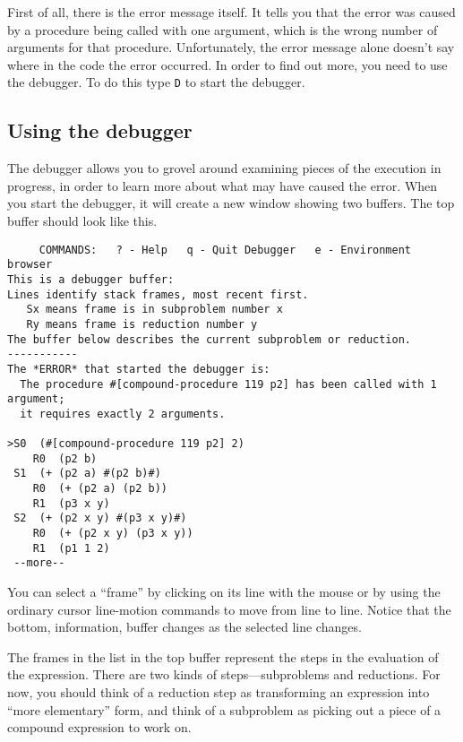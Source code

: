 First of all, there is the error message itself.  It tells you that
the error was caused by a procedure being called with one argument,
which is the wrong number of arguments for that procedure.
Unfortunately, the error message alone doesn't say where in the code
the error occurred.  In order to find out more, you need to use the
debugger.  To do this type {\tt D} to start the debugger.

\subsection{Using the debugger}

The debugger allows you to grovel around examining pieces of the
execution in progress, in order to learn more about what may have
caused the error.  When you start the debugger, it will create a new
window showing two buffers.  The top buffer should look like this.

{\small
\begin{verbatim}
     COMMANDS:   ? - Help   q - Quit Debugger   e - Environment browser
This is a debugger buffer:
Lines identify stack frames, most recent first.
   Sx means frame is in subproblem number x
   Ry means frame is reduction number y
The buffer below describes the current subproblem or reduction.
-----------
The *ERROR* that started the debugger is:
  The procedure #[compound-procedure 119 p2] has been called with 1 argument;
  it requires exactly 2 arguments.

>S0  (#[compound-procedure 119 p2] 2)
    R0  (p2 b)
 S1  (+ (p2 a) #(p2 b)#)
    R0  (+ (p2 a) (p2 b))
    R1  (p3 x y)
 S2  (+ (p2 x y) #(p3 x y)#)
    R0  (+ (p2 x y) (p3 x y))
    R1  (p1 1 2)
 --more--
\end{verbatim}
}

You can select a ``frame'' by clicking on its line with the mouse or by
using the ordinary cursor line-motion commands to move from line to line.
Notice that the bottom, information, buffer changes as the selected line
changes.

The frames in the list in the top buffer represent the steps in the
evaluation of the expression.  There are two kinds of steps---subproblems
and reductions.  For now, you should think of a reduction step as
transforming an expression into ``more elementary'' form, and think of a
subproblem as picking out a piece of a compound expression to work on.

